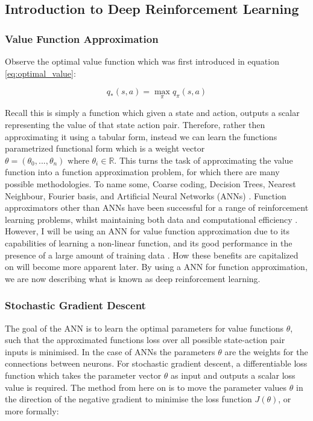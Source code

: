 \documentclass[../dissertation.tex]{subfiles}
\begin{document}
\subsection{Introduction to Deep Reinforcement Learning}

\subsubsection{Value Function Approximation}
Observe the optimal value function which was first introduced in equation \ref{eq:optimal_value}:

$$ q_*(s,a) = \max_\pi q_\pi(s,a)$$

Recall this is simply a function which given a state and action, outputs a scalar representing the value of that state action pair. Therefore, rather then approximating it using a tabular form, instead we can learn the functions parametrized functional form which is a weight vector $\theta = (\theta_0, ..., \theta_n) \text{ where } \theta_i \in \mathbb{R}$. This turns the task of approximating the value function into a function approximation problem, for which there are many possible methodologies. To name some, Coarse coding, Decision Trees, Nearest Neighbour, Fourier basis, and Artificial Neural Networks (ANNs) \cite{sutton2011reinforcement}. Function approximators other than ANNs have been successful for a range of reinforcement learning problems, whilst maintaining both data and computational efficiency \cite{sutton1996generalization, konidaris2011value, uther1998tree}. However, I will be using an ANN for value function approximation due to its capabilities of learning a non-linear function, and its good performance in the presence of a large amount of training data \cite{lecun2015deep}. How these benefits are capitalized on will become more apparent later. By using a ANN for function approximation, we are now describing what is known as deep reinforcement learning.

\subsubsection{Stochastic Gradient Descent}
The goal of the ANN is to learn the optimal parameters for value functions $\theta$, such that the approximated functions loss over all possible state-action pair inputs is minimised. In the case of ANNs the parameters $\theta$ are the weights for the connections between neurons. For stochastic gradient descent, a differentiable loss function which takes the parameter vector $\theta$ as input and outputs a scalar loss value is required. The method from here on is to move the parameter values $\theta$ in the direction of the negative gradient to minimise the loss function $J(\theta)$, or more formally:
\end{document}
